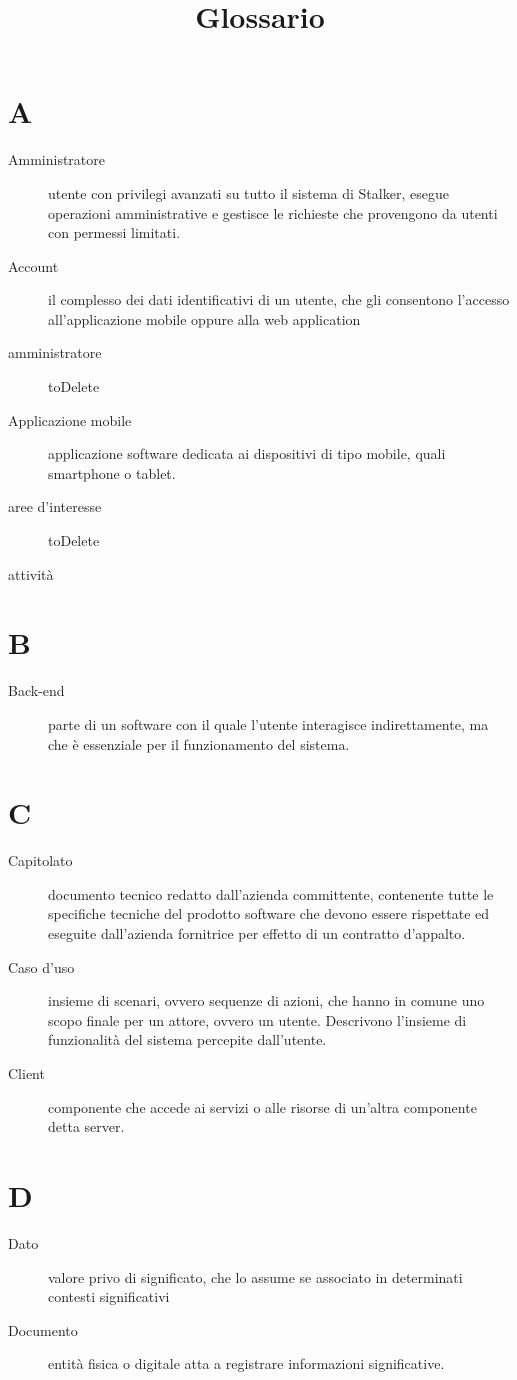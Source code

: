 \documentclass{article}
\title{Glossario}
\begin{document}


	\section{A}
	\begin{description}
		\item[Amministratore] utente con privilegi avanzati su tutto il sistema di Stalker, esegue operazioni amministrative e gestisce le richieste che provengono da utenti con permessi limitati.
		\item[Account] il complesso dei dati identificativi di un utente, che gli consentono l'accesso all'applicazione mobile oppure alla web application
		\item[amministratore] toDelete
		\item[Applicazione mobile] applicazione software dedicata ai dispositivi di tipo mobile, quali smartphone o tablet. 
		\item[aree d'interesse] toDelete
		\item[attività] 
	\end{description}
	\section{B}
	\begin{description}
		\item[Back-end] parte di un software con il quale l’utente interagisce indirettamente, ma che è essenziale per il funzionamento del sistema.
	\end{description}
	\section{C}
	\begin{description}
		\item[Capitolato] documento tecnico redatto dall'azienda committente, contenente tutte le specifiche tecniche del prodotto software che devono essere rispettate ed eseguite dall'azienda fornitrice per effetto di un contratto d'appalto.
		\item[Caso d'uso] insieme di scenari, ovvero sequenze di azioni, che hanno in comune uno scopo finale per un attore, ovvero un utente. Descrivono l’insieme di funzionalità del sistema percepite dall'utente.
		\item[Client] componente che accede ai servizi o alle risorse di un'altra componente detta server.
	\end{description}
	\section{D}
	\begin{description}
		\item[Dato] valore privo di significato, che lo assume se associato in determinati contesti significativi
		\item[Documento] entità fisica o digitale atta a registrare informazioni significative.
	\end{description}
\end{document}
